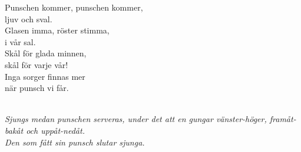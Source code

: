 \documentclass[a6paper,10pt]{article}
\begin{document}
\noindent
{}
\small

\begin{center}
\end{center}
\begin{lyrics}
Punschen kommer, punschen kommer,\\
ljuv och sval.\\
Glasen imma, röster stimma,\\
i vår sal.\\
Skål för glada minnen,\\
skål för varje vår!\\
Inga sorger finnas mer\\
när punsch vi får.
\end{lyrics}
\vspace{10pt}\\ %
\textit{Sjungs medan punschen serveras, under det att en gungar vänster-höger, framåt-bakåt och uppåt-nedåt.
\vspace{5pt}\\
Den som fått sin punsch slutar sjunga.}
\end{document}
